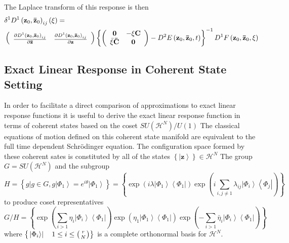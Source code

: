 \documentclass[aps,preprint]{revtex4}%
\begin{document}
The Laplace transform of this response is then%
\begin{align}
&  \delta^{1}D^{1}\left(  \mathbf{z}_{0},\mathbf{\bar{z}}_{0}\right)
_{ij}\left(  \xi\right)  =\nonumber\\
&  \left(
\begin{array}
[c]{cc}%
\frac{\partial D^{1}\left(  \mathbf{z}_{0},\mathbf{\bar{z}}_{0}\right)  _{ij}%
}{\partial\mathbf{\bar{z}}} & \frac{\partial D^{1}\left(  \mathbf{z}%
_{0},\mathbf{\bar{z}}_{0}\right)  _{ij}}{\partial\mathbf{z}}%
\end{array}
\right)  \left\{  \left(
\begin{array}
[c]{cc}%
\mathbf{0} & -\xi\mathbf{C}\\
\bar{\xi}\mathbf{\bar{C}} & \mathbf{0}%
\end{array}
\right)  -D^{2}E\left(  \mathbf{z}_{0},\mathbf{\bar{z}}_{0},t\right)
\right\}  ^{-1}D^{1}F\left(  \mathbf{z}_{0},\mathbf{\bar{z}}_{0},\xi\right)
\end{align}


\subsection{Exact Linear Response in Coherent State Setting}

In order to facilitate a direct comparison of approximations to exact linear
response functions it is useful to derive the exact linear response function
in terms of coherent states based on the coset $SU\left(  \mathcal{H}%
^{N}\right)  /U\left(  1\right)  $ The classical equations of motion defined
on this coherent state manifold are equivalent to the full time dependent
Schr\"{o}dinger equation. The configuration space formed by these coherent
sates is constituted by all of the states $\left\{  \left\vert \mathbf{z}%
\right\rangle \right\}  \in\mathcal{H}^{N}$ The group $G=SU\left(
\mathcal{H}^{N}\right)  $ and the subgroup
\begin{equation}
H=\left\{  \left.  g\right\vert g\in G,g\left\vert \Phi_{1}\right\rangle
=e^{i\theta}\left\vert \Phi_{1}\right\rangle \right\}  =\left\{  \exp\left(
i\lambda\left\vert \Phi_{1}\right\rangle \left\langle \Phi_{1}\right\vert
\right)  \exp\left(  i\sum_{i,j\neq1}\lambda_{ij}\left\vert \Phi
_{i}\right\rangle \left\langle \Phi_{j}\right\vert \right)  \right\}
\end{equation}
to produce coset representatives
\begin{equation}
G/H=\left\{  \exp\left(  \sum_{i>1}\eta_{i}\left\vert \Phi_{i}\right\rangle
\left\langle \Phi_{1}\right\vert \right)  \exp\left(  \eta_{1}\left\vert
\Phi_{1}\right\rangle \left\langle \Phi_{1}\right\vert \right)  \exp\left(
-\sum_{i>1}\bar{\eta}_{i}\left\vert \Phi_{i}\right\rangle \left\langle
\Phi_{1}\right\vert \right)  \right\}
\end{equation}
where $\left\{  \left.  \left\vert \Phi_{i}\right\rangle \right\vert
\quad1\leq i\leq\left(
\genfrac{}{}{0pt}{}{r}{N}%
\right)  \right\}  $ is a complete orthonormal basis for $\mathcal{H}^{N}$.
\end{document}
